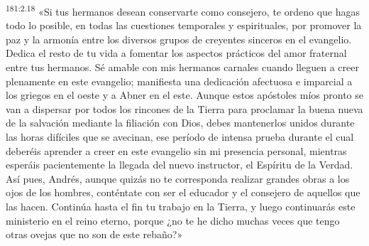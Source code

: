 \par 
\textsuperscript{181:2.18} «Si tus hermanos desean conservarte como consejero, te ordeno que hagas todo lo posible, en todas las cuestiones temporales y espirituales, por promover la paz y la armonía entre los diversos grupos de creyentes sinceros en el evangelio. Dedica el resto de tu vida a fomentar los aspectos prácticos del amor fraternal entre tus hermanos. Sé amable con mis hermanos carnales cuando lleguen a creer plenamente en este evangelio; manifiesta una dedicación afectuosa e imparcial a los griegos en el oeste y a Abner en el este. Aunque estos apóstoles míos pronto se van a dispersar por todos los rincones de la Tierra para proclamar la buena nueva de la salvación mediante la filiación con Dios, debes mantenerlos unidos durante las horas difíciles que se avecinan, ese período de intensa prueba durante el cual deberéis aprender a creer en este evangelio sin mi presencia personal, mientras esperáis pacientemente la llegada del nuevo instructor, el Espíritu de la Verdad. Así pues, Andrés, aunque quizás no te corresponda realizar grandes obras a los ojos de los hombres, conténtate con ser el educador y el consejero de aquellos que las hacen. Continúa hasta el fin tu trabajo en la Tierra, y luego continuarás este ministerio en el reino eterno, porque ¿no te he dicho muchas veces que tengo otras ovejas que no son de este rebaño?»

